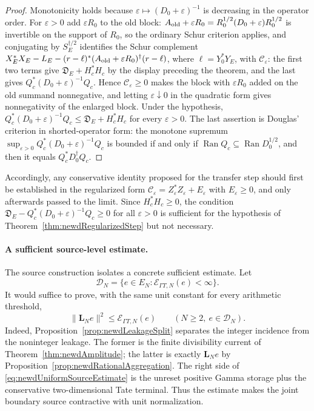 \documentclass[11pt]{amsart}
\theoremstyle{definition}
\theoremstyle{remark}
\begin{document}
\begin{proof}
Monotonicity holds because \(\varepsilon\mapsto(D_0+\varepsilon)^{-1}\) is
decreasing in the operator order.  For \(\varepsilon>0\) add \(\varepsilon R_0\) to the old block:
\(A_{\rm old}+\varepsilon R_0=R_0^{1/2}(D_0+\varepsilon)R_0^{1/2}\) is
invertible on the support of \(R_0\), so the ordinary Schur criterion
applies, and conjugating by \(S_E^{\dagger/2}\) identifies the Schur
complement
\(X_E^*X_E-L_E-(r-\ell)^*(A_{\rm old}+\varepsilon R_0)^{\dagger}(r-\ell)\),
where \(\ell=Y_0^*Y_E\), with \(\mathcal C_\varepsilon\): the first two terms
give \(\mathfrak D_E+H_c^*H_c\) by the display preceding the theorem, and the
last gives \(Q_c^*(D_0+\varepsilon)^{-1}Q_c\).  Hence
\(\mathcal C_\varepsilon\ge0\) makes the block with \(\varepsilon R_0\) added
on the old summand nonnegative, and letting \(\varepsilon\downarrow0\) in
the quadratic form gives nonnegativity of the enlarged block.  Under the
hypothesis, \(Q_c^*(D_0+\varepsilon)^{-1}Q_c\le\mathfrak D_E+H_c^*H_c\) for
every \(\varepsilon>0\).  The last assertion is Douglas'
criterion in shorted-operator form: the monotone supremum
\(\sup_{\varepsilon>0}Q_c^*(D_0+\varepsilon)^{-1}Q_c\) is bounded if and only
if \(\operatorname{Ran}Q_c\subseteq\operatorname{Ran}D_0^{1/2}\), and then it
equals \(Q_c^*D_0^\dagger Q_c\).
\end{proof}

Accordingly, any conservative identity proposed for the transfer step should
first be established in the regularized form
\(\mathcal C_\varepsilon=Z_\varepsilon^*Z_\varepsilon+E_\varepsilon\) with
\(E_\varepsilon\ge0\), and only afterwards passed to the limit.  Since
\(H_c^*H_c\ge0\), the condition
\(\mathfrak D_E-Q_c^*(D_0+\varepsilon)^{-1}Q_c\ge0\) for all
\(\varepsilon>0\) is sufficient for the hypothesis of
Theorem~\ref{thm:newdRegularizedStep} but not necessary.

\paragraph{A sufficient source-level estimate.}
The source construction isolates a concrete sufficient estimate.  Let
\[
 \mathscr D_N=
 \{e\in E_N:\mathcal E_{\Gamma T,N}(e)<\infty\}.
\]
It would suffice to prove, with the same unit constant for every arithmetic
threshold,
\begin{equation}\label{eq:newdUniformSourceEstimate}
 \|\mathbf L_Ne\|^2\leq\mathcal E_{\Gamma T,N}(e)
 \qquad(N\geq2,\ e\in\mathscr D_N).
\end{equation}
Indeed, Proposition~\ref{prop:newdLeakageSplit} separates the integer
incidence from the noninteger leakage.  The former is the finite
divisibility current of Theorem~\ref{thm:newdAmplitude}; the latter is
exactly $\mathbf L_Ne$ by
Proposition~\ref{prop:newdRationalAggregation}.  The right side of
\eqref{eq:newdUniformSourceEstimate} is the unreset positive Gamma storage
plus the conservative two-dimensional Tate terminal.  Thus the estimate makes
the joint boundary source contractive with unit normalization.
\end{document}
